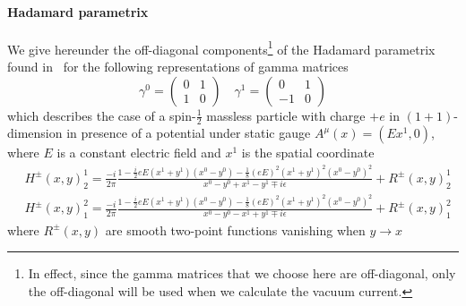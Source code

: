 \paragraph{Hadamard parametrix}
We give hereunder the off-diagonal components\footnote{
In effect, since the gamma matrices that we choose here are off-diagonal, only the off-diagonal will be used when we calculate the vacuum current.
}
 of the Hadamard parametrix found in~\cite{Zahn2015} for the following representations of gamma matrices
\begin{equation*}
\gamma^0 = \begin{pmatrix}
0 & 1 \\
1 & 0 \end{pmatrix}  \quad  \gamma^1 = \begin{pmatrix}
0  & 1 \\
-1 & 0
\end{pmatrix}
\end{equation*}
which describes the case of a spin-$\frac 1 2$ massless particle with charge $+e$ in $(1+1)$-dimension in presence of a potential under static gauge $A^\mu(x) = (Ex^1, 0)$, where $E$ is a constant electric field and $x^1$ is the spatial coordinate
\begin{equation}\label{vacuum-hadamardparametrix}
\begin{split}
& H^\pm (x, y)^1_2 = \frac{-i}{2\pi}\frac{1-\frac i 2 e E(x^1 + y^1)(x^0-y^0) 
- \frac 1 8 (eE)^2(x^1 + y^1)^2(x^0 - y^0)^2}{x^0 - y^0 + x^1 - y^1 \mp i \epsilon}  + R^\pm(x,y)^{1}_2\\
& H^\pm (x, y)^2_1 = \frac{-i}{2\pi}\frac{1-\frac i 2 e E(x^1 + y^1)(x^0-y^0) 
- \frac 1 8 (eE)^2(x^1 + y^1)^2(x^0 - y^0)^2}{x^0 - y^0 - x^1 + y^1 \mp i \epsilon} + R^\pm(x,y)^{2}_1
\end{split}
\end{equation}
where $R^\pm(x,y)$ are smooth two-point functions vanishing when $y\rightarrow x$
















